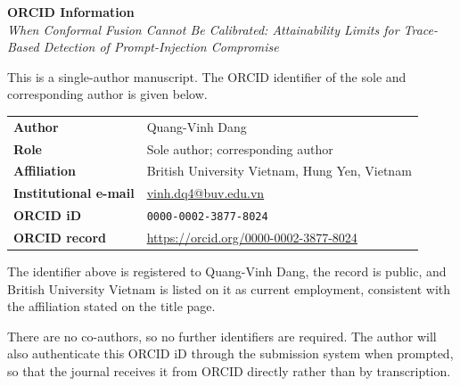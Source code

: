 \documentclass[11pt]{article}
\begin{document}
\begin{center}
{\large\bfseries ORCID Information}\\[0.4em]
\emph{When Conformal Fusion Cannot Be Calibrated: Attainability Limits
for Trace-Based Detection of Prompt-Injection Compromise}
\end{center}

\vspace{1.2em}

\noindent
This is a single-author manuscript. The ORCID identifier of the sole and
corresponding author is given below.

\vspace{1em}

\noindent
\begin{tabular}{@{}p{}p{}@{}}
\textbf{Author} & Quang-Vinh Dang \\[0.5em]
\textbf{Role} & Sole author; corresponding author \\[0.5em]
\textbf{Affiliation} & British University Vietnam, Hung Yen, Vietnam \\[0.5em]
\textbf{Institutional e-mail} &
  \href{mailto:vinh.dq4@buv.edu.vn}{vinh.dq4@buv.edu.vn} \\[0.5em]
\textbf{ORCID iD} & \texttt{0000-0002-3877-8024} \\[0.5em]
\textbf{ORCID record} &
  \url{https://orcid.org/0000-0002-3877-8024} \\
\end{tabular}

\vspace{1.5em}

\noindent
The identifier above is registered to Quang-Vinh Dang, the record is public, and
British University Vietnam is listed on it as current employment, consistent with
the affiliation stated on the title page.

\vspace{1em}

\noindent
There are no co-authors, so no further identifiers are required. The author will
also authenticate this ORCID iD through the submission system when prompted, so
that the journal receives it from ORCID directly rather than by transcription.
\end{document}

